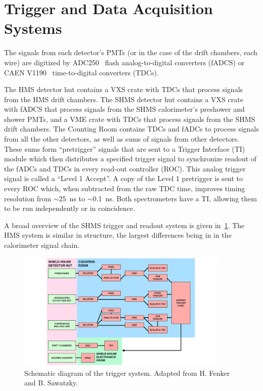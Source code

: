 \section{Trigger and Data Acquisition Systems}
\label{section:daq}

The signals from each detector's PMTs (or in the case of the drift chambers,
each wire) are digitized by ADC250~\cite{fADC_manual} flash analog-to-digital
converters (fADCS) or CAEN V1190~\cite{CAEN_1190_manual} time-to-digital
converters (TDCs).

The HMS detector hut contains a VXS crate with TDCs that process signals from
the HMS drift chambers.
The SHMS detector hut contains a VXS crate with fADCS that process signals from
the SHMS calorimeter's preshower and shower PMTs, and a VME crate with TDCs
that process signals from the SHMS drift chambers.
The Counting Room contains TDCs and fADCs to process signals from all the other
detectors, as well as sums of signals from other detectors.
These sums form ``pretrigger'' signals that are sent to a Trigger Interface
(TI) module which then distributes a specified trigger signal to synchronize
readout of the fADCs and TDCs in every read-out controller (ROC).
This analog trigger signal is called a ``Level 1 Accept''.
A copy of the Level 1 pretrigger is sent to every ROC which, when subtracted
from the raw TDC time, improves timing resolution from $\sim$\SI{25}{ns} to
$\sim$\SI{0.1}{ns}.
Both spectrometers have a TI, allowing them to be run independently or in
coincidence.


A broad overview of the SHMS trigger and readout system is given
in~\ref{fig:trigger_block_diagram}.
The HMS system is similar in structure, the largest differences being in in the
calorimeter signal chain.

\begin{figure}[!h]
    \centering
    \includegraphics[width=0.9\textwidth]{chap3/trigger_block_diagram.pdf}
    \caption{Schematic diagram of the trigger system.
             Adapted from H. Fenker and B. Sawatzky.
             }
    \label{fig:trigger_block_diagram}
\end{figure}

